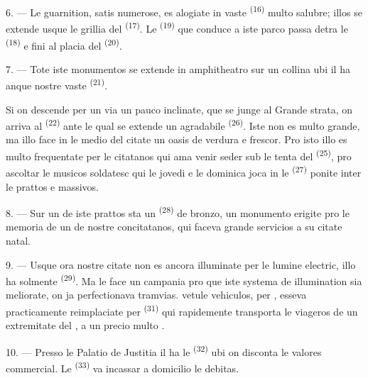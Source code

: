 \VUsaut{5.0mm}
\VUsaut{3.4mm}

6. --- Le guarnition, satis numerose, es alogiate in vaste 
\textsuperscript{(16)} multo salubre; illos se extende usque le grillia del
 \textsuperscript{(17)}. Le 
\textsuperscript{(19)} que conduce a iste parco passa detra le  \textsuperscript{(18)} e fini al placia del 
\textsuperscript{(20)}.

7. --- Tote iste monumentos se extende in amphitheatro sur un collina ubi il ha
anque nostre vaste  \textsuperscript{(21)}.

Si on descende per un via un pauco inclinate, que se junge al Grande strata, on
arriva al  \textsuperscript{(22)} ante le qual se extende un
agradabile  \textsuperscript{(26)}. Iste  non es multo grande, ma illo face in le medio del citate un oasis de
verdura e frescor. Pro isto illo es multo frequentate per le citatanos qui ama
venir seder sub le tenta del  \textsuperscript{(25)}, pro ascoltar
le musicos soldatesc qui le jovedi e le dominica joca in le 
\textsuperscript{(27)} ponite inter le prattos e massivos.

8. --- Sur un de iste prattos sta un  \textsuperscript{(28)} de
bronzo, un monumento erigite pro le memoria de un de nostre concitatanos, qui
faceva grande servicios a su citate natal.

\VUsaut{4.0mm}
\VUsaut{3.4mm}

9. --- Usque ora nostre citate non es ancora illuminate per le lumine electric,
illo ha solmente  \textsuperscript{(29)}. Ma le
 face un campania pro que iste systema de illumination sia
meliorate,  on ja perfectionava 
tramvias.  vetule vehiculos,  per ,
esseva practicamente reimplaciate per 
\textsuperscript{(31)} qui rapidemente transporta le viageros de un extremitate
del , a un precio multo .

10. --- Presso le Palatio de Justitia il ha le 
\textsuperscript{(32)} ubi on disconta le valores commercial. Le  \textsuperscript{(33)} va incassar a domicilio le debitas.

